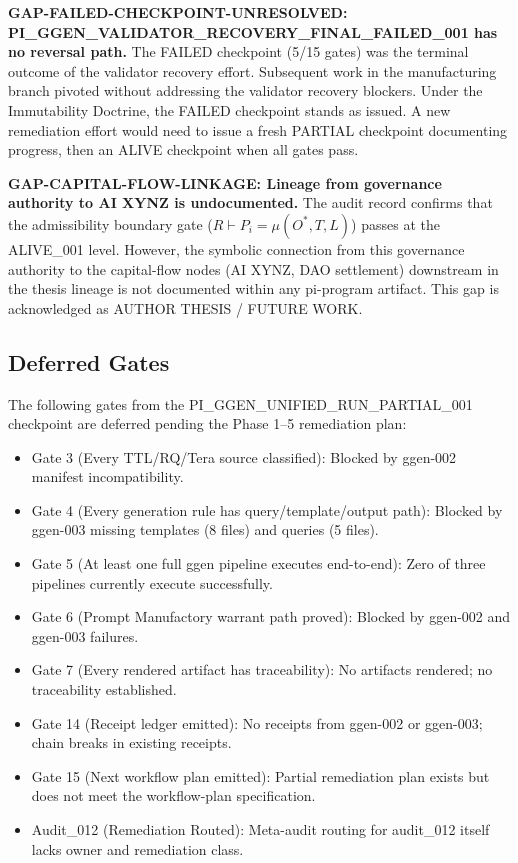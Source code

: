 \textbf{GAP-FAILED-CHECKPOINT-UNRESOLVED: PI\_GGEN\_VALIDATOR\_RECOVERY\_FINAL\_FAILED\_001 has no reversal path.} The FAILED checkpoint (5/15 gates) was the terminal outcome of the validator recovery effort. Subsequent work in the manufacturing branch pivoted without addressing the validator recovery blockers. Under the Immutability Doctrine, the FAILED checkpoint stands as issued. A new remediation effort would need to issue a fresh PARTIAL checkpoint documenting progress, then an ALIVE checkpoint when all gates pass.

\textbf{GAP-CAPITAL-FLOW-LINKAGE: Lineage from governance authority to AI XYNZ is undocumented.} The audit record confirms that the admissibility boundary gate ($R \vdash P_i = \mu(O^{*}, T, L)$) passes at the ALIVE\_001 level. However, the symbolic connection from this governance authority to the capital-flow nodes (AI XYNZ, DAO settlement) downstream in the thesis lineage is not documented within any pi-program artifact. This gap is acknowledged as AUTHOR THESIS / FUTURE WORK.

\subsection{Deferred Gates}
\label{sec:research-pi-program-openq-deferred}

The following gates from the PI\_GGEN\_UNIFIED\_RUN\_PARTIAL\_001 checkpoint are deferred pending the Phase 1--5 remediation plan:

\begin{itemize}
  \item Gate 3 (Every TTL/RQ/Tera source classified): Blocked by ggen-002 manifest incompatibility.
  \item Gate 4 (Every generation rule has query/template/output path): Blocked by ggen-003 missing templates (8 files) and queries (5 files).
  \item Gate 5 (At least one full ggen pipeline executes end-to-end): Zero of three pipelines currently execute successfully.
  \item Gate 6 (Prompt Manufactory warrant path proved): Blocked by ggen-002 and ggen-003 failures.
  \item Gate 7 (Every rendered artifact has traceability): No artifacts rendered; no traceability established.
  \item Gate 14 (Receipt ledger emitted): No receipts from ggen-002 or ggen-003; chain breaks in existing receipts.
  \item Gate 15 (Next workflow plan emitted): Partial remediation plan exists but does not meet the workflow-plan specification.
  \item Audit\_012 (Remediation Routed): Meta-audit routing for audit\_012 itself lacks owner and remediation class.
\end{itemize}

